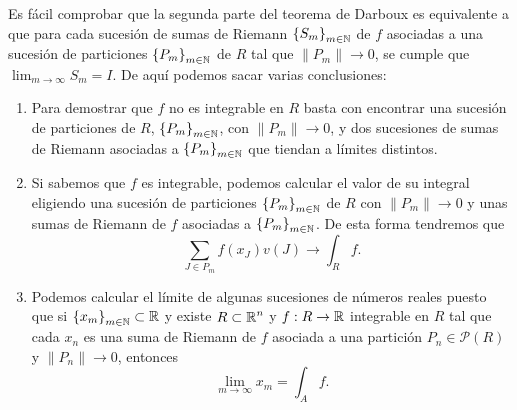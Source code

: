 \begin{observation}
	Es fácil comprobar que la segunda parte del teorema de Darboux es equivalente a que para cada sucesión de sumas de Riemann $\displaystyle \left\{ S_{m}\right\} _{m\in\mathbb{N}} $ de $\displaystyle f $ asociadas a una sucesión de particiones $\displaystyle \left\{ P_{m}\right\} _{m\in\mathbb{N}} $ de $\displaystyle R $ tal que $\displaystyle \|P_{m}\|\to 0 $, se cumple que $\displaystyle \lim_{m \to \infty}S_{m} = I $. De aquí podemos sacar varias conclusiones:
	\begin{enumerate}
	\item Para demostrar que $\displaystyle f $ no es integrable en $\displaystyle R $ basta con encontrar una sucesión de particiones de $\displaystyle R $, $\displaystyle \left\{ P_{m}\right\} _{m\in\mathbb{N}} $, con $\displaystyle \|P_{m}\|\to 0 $, y dos sucesiones de sumas de Riemann asociadas a $\displaystyle \left\{ P_{m}\right\} _{m\in\mathbb{N}} $ que tiendan a límites distintos.
	\item Si sabemos que $\displaystyle f $ es integrable, podemos calcular el valor de su integral eligiendo una sucesión de particiones $\displaystyle \left\{ P_{m}\right\} _{m\in\mathbb{N}} $ de $\displaystyle R $ con $\displaystyle \|P_{m}\|\to0 $ y unas sumas de Riemann de $\displaystyle f $ asociadas a $\displaystyle \left\{ P_{m}\right\} _{m\in\mathbb{N}} $. De esta forma tendremos que
		\[\sum^{}_{J\in P_{m}}f\left(x_{J}\right)v\left(J\right)\to\int _{R}f .\]
	\item Podemos calcular el límite de algunas sucesiones de números reales puesto que si $\displaystyle \left\{ x_{m}\right\} _{m\in\mathbb{N}} \subset \mathbb{R}$ y existe $\displaystyle R \subset \mathbb{R}^{n} $ y $\displaystyle f : R \to \mathbb{R} $ integrable en $\displaystyle R $ tal que cada $\displaystyle x_{n} $ es una suma de Riemann de $\displaystyle f $ asociada a una partición $\displaystyle P_{n} \in \mathcal{P}\left(R\right)$ y $\displaystyle \|P_{n}\| \to 0 $, entonces
		\[\lim_{m \to \infty}x_{m}=\int _{A}f .\]
	\end{enumerate}
\end{observation}
